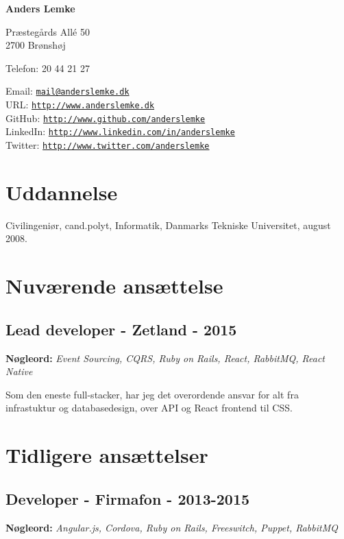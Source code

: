\documentclass[a4paper]{article}
\newcommand{\keywords}[1]{\small\textbf{Nøgleord:} \emph{#1}\normalsize}
\begin{document}
{\huge\bf Anders Lemke}

\bigskip
Præstegårds Allé 50 \\
2700 Brønshøj

\medskip

Telefon: 20 44 21 27

\medskip

Email: \href{mailto:mail@anderslemke.dk}{\tt mail@anderslemke.dk} \\
URL: \href{http://www.anderslemke.dk}{\tt http://www.anderslemke.dk} \\
GitHub: \href{http://www.github.com/anderslemke}{\tt http://www.github.com/anderslemke} \\
LinkedIn: \href{http://www.linkedin.com/in/anderslemke}{\tt http://www.linkedin.com/in/anderslemke} \\
Twitter: \href{http://www.twitter.com/anderslemke}{\tt http://www.twitter.com/anderslemke} 

\section*{Uddannelse}

Civilingeniør, cand.polyt, Informatik, Danmarks Tekniske Universitet, august 2008.

\section*{Nuværende ansættelse}

\subsection*{Lead developer - Zetland - 2015}
\keywords{Event Sourcing, CQRS, Ruby on Rails, React, RabbitMQ, React Native}

Som den eneste full-stacker, har jeg det overordende ansvar for alt fra infrastuktur og databasedesign, over API og React frontend til CSS.

\section*{Tidligere ansættelser}

\subsection*{Developer - Firmafon - 2013-2015}
\keywords{Angular.js, Cordova, Ruby on Rails, Freeswitch, Puppet, RabbitMQ}
\end{document}
